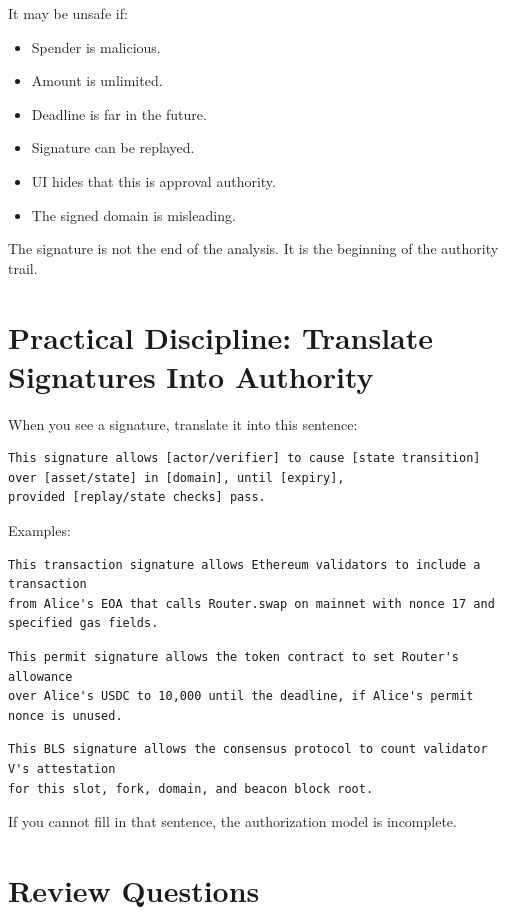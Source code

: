 It may be unsafe if:

\begin{itemize}
\tightlist
\item
  Spender is malicious.
\item
  Amount is unlimited.
\item
  Deadline is far in the future.
\item
  Signature can be replayed.
\item
  UI hides that this is approval authority.
\item
  The signed domain is misleading.
\end{itemize}

The signature is not the end of the analysis. It is the beginning of the
authority trail.

\section{Practical Discipline: Translate Signatures Into Authority}

When you see a signature, translate it into this sentence:

\begin{lstlisting}
This signature allows [actor/verifier] to cause [state transition]
over [asset/state] in [domain], until [expiry],
provided [replay/state checks] pass.
\end{lstlisting}

Examples:

\begin{lstlisting}
This transaction signature allows Ethereum validators to include a transaction
from Alice's EOA that calls Router.swap on mainnet with nonce 17 and specified gas fields.
\end{lstlisting}

\begin{lstlisting}
This permit signature allows the token contract to set Router's allowance
over Alice's USDC to 10,000 until the deadline, if Alice's permit nonce is unused.
\end{lstlisting}

\begin{lstlisting}
This BLS signature allows the consensus protocol to count validator V's attestation
for this slot, fork, domain, and beacon block root.
\end{lstlisting}

If you cannot fill in that sentence, the authorization model is
incomplete.

\section{Review Questions}

